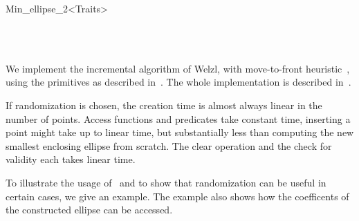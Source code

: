 \begin{ccRefClass}{Min_ellipse_2<Traits>}
\ccSeeAlso

\\[1ex]
\\[1ex]

\ccImplementation
\ccIndexImplementation

We implement the incremental algorithm of Welzl, with move-to-front
heuristic~\cite{w-sedbe-91a}, using the primitives as described
in~\cite{gs-epsee-97,cgal:gs-seefe-97a}. The whole implementation is described
in~\cite{cgal:gs-seeeg-98}.

If randomization is
chosen, the creation time is almost always linear in the number of points.
Access functions and predicates take constant time, inserting a point might
take up to linear time, but substantially less than computing the new
smallest enclosing ellipse from scratch. The clear operation and the check
for validity each takes linear time.

\ccExample
{}

To illustrate the usage of \ccRefName\ and to show that randomization
can be useful in certain cases, we give an example. The example also
shows how the coefficents of the constructed ellipse can be accessed. 



\ccRestoreThreeColumns

\end{ccRefClass}


